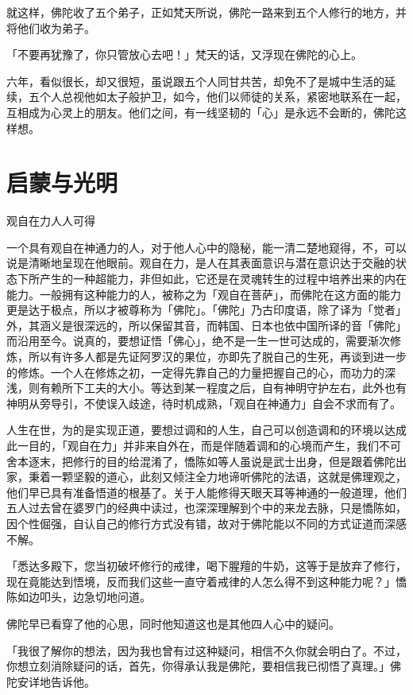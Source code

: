 \documentclass[12pt,twoside,openany]{book}
\begin{document}
就这样，佛陀收了五个弟子，正如梵天所说，佛陀一路来到五个人修行的地方，并将他们收为弟子。

「不要再犹豫了，你只管放心去吧！」梵天的话，又浮现在佛陀的心上。

六年，看似很长，却又很短，虽说跟五个人同甘共苦，却免不了是城中生活的延续，五个人总视他如太子般护卫，如今，他们以师徒的关系，紧密地联系在一起，互相成为心灵上的朋友。他们之间，有一线坚韧的「心」是永远不会断的，佛陀这样想。

\section{启蒙与光明}\label{sec2.5}

观自在力人人可得

一个具有观自在神通力的人，对于他人心中的隐秘，能一清二楚地窥得，不，可以说是清晰地呈现在他眼前。观自在力，是人在其表面意识与潜在意识达于交融的状态下所产生的一种超能力，非但如此，它还是在灵魂转生的过程中培养出来的内在能力。一般拥有这种能力的人，被称之为「观自在菩萨」，而佛陀在这方面的能力更是达于极点，所以才被尊称为「佛陀」。「佛陀」乃古印度语，除了译为「觉者」外，其涵义是很深远的，所以保留其音，而韩国、日本也依中国所译的音「佛陀」而沿用至今。说真的，要想证悟「佛心」，绝不是一生一世可达成的，需要渐次修炼，所以有许多人都是先证阿罗汉的果位，亦即先了脱自己的生死，再谈到进一步的修炼。一个人在修炼之初，一定得先靠自己的力量把握自己的心，而功力的深浅，则有赖所下工夫的大小。等达到某一程度之后，自有神明守护左右，此外也有神明从旁导引，不使误入歧途，待时机成熟，「观自在神通力」自会不求而有了。

人生在世，为的是实现正道，要想过调和的人生，自己可以创造调和的环境以达成此一目的，「观自在力」并非来自外在，而是伴随着调和的心境而产生，我们不可舍本逐末，把修行的目的给混淆了，憍陈如等人虽说是武士出身，但是跟着佛陀出家，秉着一颗坚毅的道心，此刻又倾注全力地谛听佛陀的法语，这就是佛理观之，他们早已具有准备悟道的根基了。关于人能修得天眼天耳等神通的一般道理，他们五人过去曾在婆罗门的经典中读过，也深深理解到个中的来龙去脉，只是憍陈如，因个性倔强，自认自己的修行方式没有错，故对于佛陀能以不同的方式证道而深感不解。

「悉达多殿下，您当初破坏修行的戒律，喝下腥羶的牛奶，这等于是放弃了修行，现在竟能达到悟境，反而我们这些一直守着戒律的人怎么得不到这种能力呢？」憍陈如边叩头，边急切地问道。

佛陀早已看穿了他的心思，同时他知道这也是其他四人心中的疑问。

「我很了解你的想法，因为我也曾有过这种疑问，相信不久你就会明白了。不过，你想立刻消除疑问的话，首先，你得承认我是佛陀，要相信我已彻悟了真理。」佛陀安详地告诉他。
\end{document}
